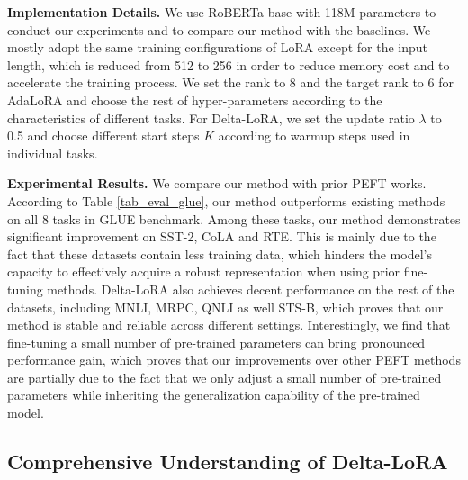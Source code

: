 {\textbf{Implementation Details.} We use RoBERTa-base with 118M parameters to conduct our experiments and to compare our method with the baselines. We mostly adopt the same training configurations of LoRA except for the input length, which is reduced from 512 to 256 in order to reduce memory cost and to accelerate the training process. We set the rank to 8 and the target rank to 6 for AdaLoRA and choose the rest of hyper-parameters according to the characteristics of different tasks. For Delta-LoRA, we set the update ratio $\lambda$ to 0.5 and choose different start steps $K$ according to warmup steps used in individual tasks. 

\textbf{Experimental Results.} We compare our method with prior PEFT works. According to Table  \ref{tab_eval_glue}, our method outperforms existing methods on all 8 tasks in GLUE benchmark. Among these tasks, our method demonstrates significant improvement on SST-2, CoLA and RTE. This is mainly due to the fact that these datasets contain less training data, which hinders the model's capacity to effectively acquire a robust representation when using prior fine-tuning methods. Delta-LoRA also achieves decent performance on the rest of the datasets, including MNLI, MRPC, QNLI as well STS-B, which proves that our method is stable and reliable across different settings. Interestingly, we find that fine-tuning a small number of pre-trained parameters can bring pronounced performance gain, which proves that our improvements over other PEFT methods are partially due to the fact that we only adjust a small number of pre-trained parameters while inheriting the generalization capability of the pre-trained model.

\subsection{Comprehensive Understanding of Delta-LoRA}

}
